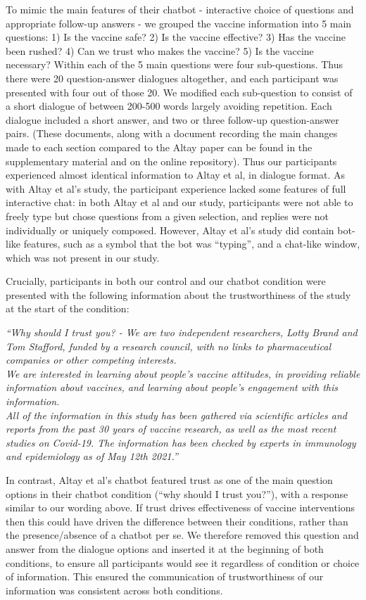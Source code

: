 \documentclass[
  english,
  ,jou,floatsintext]{apa6}
\begin{document}
To mimic the main features of their chatbot - interactive choice of questions and appropriate follow-up answers - we grouped the vaccine information into 5 main questions: 1) Is the vaccine safe? 2) Is the vaccine effective? 3) Has the vaccine been rushed? 4) Can we trust who makes the vaccine? 5) Is the vaccine necessary? Within each of the 5 main questions were four sub-questions. Thus there were 20 question-answer dialogues altogether, and each participant was presented with four out of those 20. We modified each sub-question to consist of a short dialogue of between 200-500 words largely avoiding repetition. Each dialogue included a short answer, and two or three follow-up question-answer pairs. (These documents, along with a document recording the main changes made to each section compared to the Altay paper can be found in the supplementary material and on the online repository). Thus our participants experienced almost identical information to Altay et al, in dialogue format. As with Altay et al's study, the participant experience lacked some features of full interactive chat: in both Altay et al and our study, participants were not able to freely type but chose questions from a given selection, and replies were not individually or uniquely composed. However, Altay et al's study did contain bot-like features, such as a symbol that the bot was ``typing'', and a chat-like window, which was not present in our study.

Crucially, participants in both our control and our chatbot condition were presented with the following information about the trustworthiness of the study at the start of the condition:

\emph{``Why should I trust you? - We are two independent researchers, Lotty Brand and Tom Stafford, funded by a research council, with no links to pharmaceutical companies or other competing interests. }\\
\emph{We are interested in learning about people's vaccine attitudes, in providing reliable information about vaccines, and learning about people's engagement with this information. }\\
\emph{All of the information in this study has been gathered via scientific articles and reports from the past 30 years of vaccine research, as well as the most recent studies on Covid-19. The information has been checked by experts in immunology and epidemiology as of May 12th 2021.''}

In contrast, Altay et al's chatbot featured trust as one of the main question options in their chatbot condition (``why should I trust you?''), with a response similar to our wording above. If trust drives effectiveness of vaccine interventions then this could have driven the difference between their conditions, rather than the presence/absence of a chatbot per se. We therefore removed this question and answer from the dialogue options and inserted it at the beginning of both conditions, to ensure all participants would see it regardless of condition or choice of information. This ensured the communication of trustworthiness of our information was consistent across both conditions.
\end{document}
